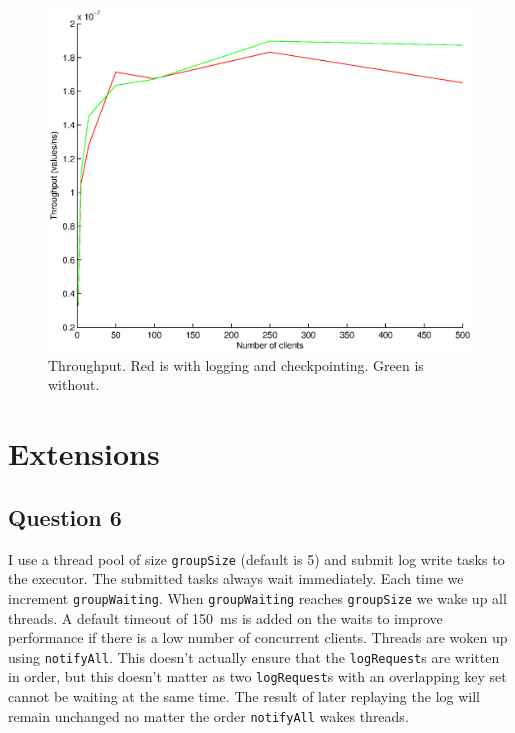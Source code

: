 \documentclass[a4paper]{article}
\begin{document}
\begin{figure}[h]
    \centering
    \includegraphics[scale=0.7]{throughput}
    \caption{Throughput. Red is with logging and checkpointing. Green is without.}
    \label{fig:throughput}
\end{figure}

\section{Extensions}

\subsection{Question 6}

I use a thread pool of size \texttt{groupSize} (default is 5) and submit log
write tasks to the executor. The submitted tasks always wait immediately. Each
time we increment \texttt{groupWaiting}. When \texttt{groupWaiting} reaches
\texttt{groupSize} we wake up all threads. A default timeout of 150~ms is added
on the waits to improve performance if there is a low number of concurrent
clients. Threads are woken up using \texttt{notifyAll}. This doesn't actually
ensure that the \texttt{logRequest}s are written in order, but this doesn't
matter as two \texttt{logRequest}s with an overlapping key set cannot be
waiting at the same time. The result of later replaying the log will remain
unchanged no matter the order \texttt{notifyAll} wakes threads.
\end{document}

